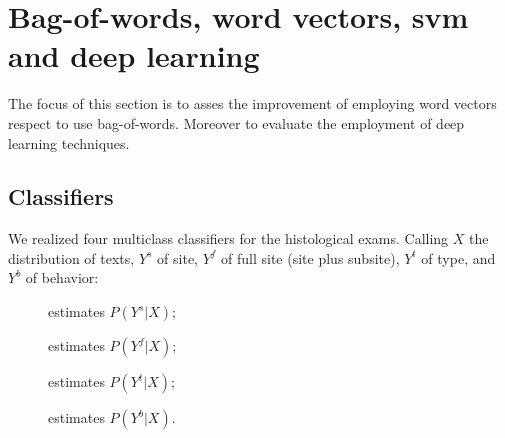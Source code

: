 \section{Bag-of-words, word vectors, \ac{svm} and deep learning}
\label{ch:icdoFirst}
The focus of this section is to asses the improvement of employing
word vectors respect to use bag-of-words. Moreover to evaluate the
employment of deep learning techniques.

\subsection{Classifiers}
We realized four multiclass classifiers for the
histological exams. Calling $X$ the distribution of texts, $Y^s$
of site, $Y^f$ of full site (site plus subsite), $Y^t$ of type, and
$Y^b$ of behavior:
\begin{description}
  \item[\site{}] estimates $P(Y^s|X)$;
  \item[\fullSite{}] estimates $P(Y^f|X)$;
  \item[\type{}] estimates $P(Y^t|X)$;
  \item[\behaviour{}] estimates $P(Y^b|X)$.
\end{description}



